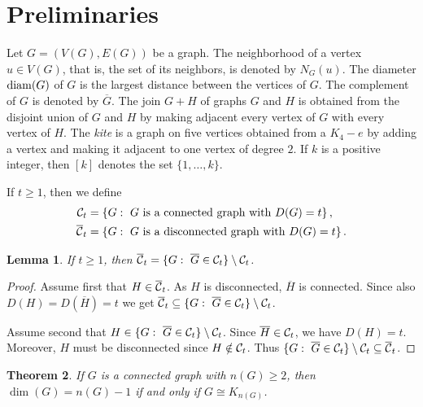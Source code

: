 \documentclass[12pt]{article}
\newtheorem{theorem}{Theorem}[section]
\newtheorem{lemma}[theorem]{Lemma}
\DeclareMathOperator {\diam} {{\rm diam}}
\begin{document}
\section{Preliminaries} 
\label{sec:prelim}

Let $G = (V(G), E(G))$ be a graph. The neighborhood of a vertex $u\in V(G)$, that is, the set of its neighbors, is denoted by $N_G(u)$. The diameter $\diam(G)$ of $G$ is the largest distance between the vertices of $G$. The complement of $G$ is denoted by $\overline{G}$. The join $G+H$ of graphs $G$ and $H$ is obtained from the disjoint union of $G$ and $H$ by making adjacent every vertex of $G$ with every vertex of $H$. The {\em kite} is a graph on five vertices obtained from a $K_4-e$ by adding a vertex and making it adjacent to one vertex of degree $2$. If $k$ is a positive integer, then $[k]$ denotes the set $\{1,\ldots, k\}$. 

If $t\ge 1$, then we define 
\begin{align*}
{\cal C}_t & = \{G:\ G\ \text{is a connected graph with}\ D(G) = t\}\,,\\
\overline{{\cal C}}_t & = \{G:\ G\ \text{is a disconnected graph with}\ D(G) = t\}\,.
\end{align*}

\begin{lemma} \label{lem:discon}
If $t\ge 1$, then $\overline{{\cal C}}_t = \{G:\ \overline{G}\in {\cal C}_t\} \setminus {\cal C}_t$.
\end{lemma}

\begin{proof} 
Assume first that $H\in \overline{{\cal C}}_t$. As $H$ is disconnected, $\overline{H}$ is connected. Since also $D(H) = D(\overline{H}) = t$ we get $\overline{{\cal C}}_t \subseteq \{G:\ \overline{G}\in {\cal C}_t\} \setminus {\cal C}_t$. 

Assume second that $H\in \{G:\ \overline{G}\in {\cal C}_t\} \setminus {\cal C}_t$. Since $\overline{H}\in {\cal C}_t$, we have $D(H) = t$. Moreover, $H$ must be disconnected since $H\notin {\cal C}_t$. Thus $\{G:\ \overline{G}\in {\cal C}_t\} \setminus {\cal C}_t \subseteq \overline{{\cal C}}_t$. 
\end{proof}

\begin{theorem} {\rm \cite[Theorem 3]{0}}
\label{t2}
If $G$ is a connected graph with $n(G) \ge 2$, then $\dim(G) = n(G) - 1$ if and only if $G \cong K_{n(G)}$.
\end{theorem}
\end{document}
